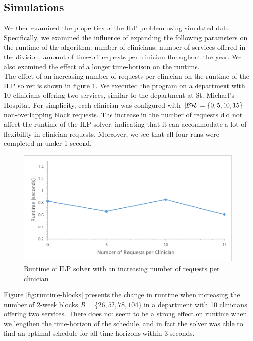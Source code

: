 \subsection{Simulations}
We then examined the properties of the ILP problem using simulated data. Specifically, we examined the influence of expanding the following parameters on the runtime of the algorithm: number of clinicians; number of services offered in the division; amount of time-off requests per clinician throughout the year. We also examined the effect of a longer time-horizon on the runtime. \\

The effect of an increasing number of requests per clinician on the runtime of the ILP solver is shown in figure \ref{fig:runtime-requests}. We executed the program on a department with 10 clinicians offering two services, similar to the department at St. Michael's Hospital. For simplicity, each clinician was configured with $\abs{\mathcal{BR}} = \{0, 5, 10, 15\}$ non-overlapping block requests. The increase in the number of requests did not affect the runtime of the ILP solver, indicating that it can accommodate a lot of flexibility in clinician requests. Moreover, we see that all four runs were completed in under 1 second. \\

\begin{figure}[h]
	\centering
	\includegraphics[scale=.5]{fig/runtime_requests}
	\caption{Runtime of ILP solver with an increasing number of requests per clinician}
	\label{fig:runtime-requests}
\end{figure}

Figure \ref{fig:runtime-blocks} presents the change in runtime when increasing the number of 2-week blocks $B = \{26, 52, 78, 104\}$ in a department with 10 clinicians offering two services. There does not seem to be a strong effect on runtime when we lengthen the time-horizon of the schedule, and in fact the solver was able to find an optimal schedule for all time horizons within 3 seconds. \\ %

